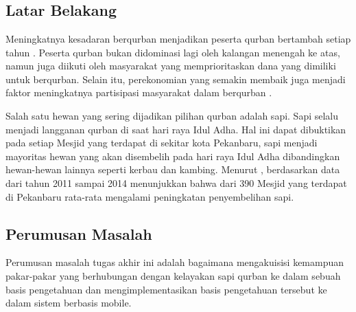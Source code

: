 %
%
%
%

\chapter{\babSatu}

\section{Latar Belakang}
Meningkatnya kesadaran berqurban menjadikan peserta qurban bertambah setiap tahun . Peserta qurban bukan didominasi lagi oleh kalangan menengah ke atas, namun juga diikuti oleh masyarakat yang memprioritaskan dana yang dimiliki untuk berqurban. Selain itu, perekonomian yang semakin membaik juga menjadi faktor meningkatnya partisipasi masyarakat dalam berqurban \cite{sari2017sistem}.

Salah satu hewan yang sering dijadikan pilihan qurban adalah sapi. Sapi selalu menjadi langganan qurban di saat hari raya Idul Adha. Hal ini dapat dibuktikan pada setiap Mesjid yang terdapat di sekitar kota Pekanbaru, sapi menjadi mayoritas hewan yang akan disembelih pada hari raya Idul Adha dibandingkan hewan-hewan lainnya seperti kerbau dan kambing. Menurut , berdasarkan data dari tahun 2011 sampai 2014 menunjukkan bahwa dari 390 Mesjid yang terdapat di Pekanbaru rata-rata mengalami peningkatan penyembelihan sapi.

\section{Perumusan Masalah}
Perumusan masalah tugas akhir ini adalah bagaimana mengakuisisi kemampuan pakar-pakar yang berhubungan dengan kelayakan sapi qurban ke dalam sebuah basis pengetahuan dan mengimplementasikan basis pengetahuan tersebut ke dalam sistem berbasis mobile.


